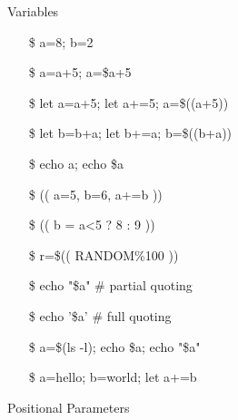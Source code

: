 \begin{frame}{Variables}\ttfamily\small
  \begin{itemize}
  \item[\$] a=8; b=2
  \item[\$] a=a+5; a=\$a+5 \Bad
  \item[\$] let a=a+5; let a+=5; a=\$((a+5)) \Good
  \item[\$] let b=b+a; let b+=a; b=\$((b+a)) \Good
  \item[\$] echo a; echo \$a
  \item[\$] (( a=5, b=6, a+=b )) \Good
  \item[\$] (( b = a<5 ? 8 : 9 )) \Good
  \item[\$] r=\$(( RANDOM\%100 )) \Good
  \item[\$] echo "\$a" \# partial quoting
  \item[\$] echo '\$a' \# full quoting
  \item[\$] a=\$(ls -l); echo \$a; echo "\$a"
  \item[\$] a=hello; b=world; let a+=b \Bad
  \end{itemize}
\end{frame}

\begin{frame}{Positional Parameters}{}
  \begin{center}
    \begin{minipage}{.42\linewidth}
    \end{minipage}\quad
    \begin{minipage}{.54\linewidth}
    \end{minipage}
  \end{center}
\end{frame}

